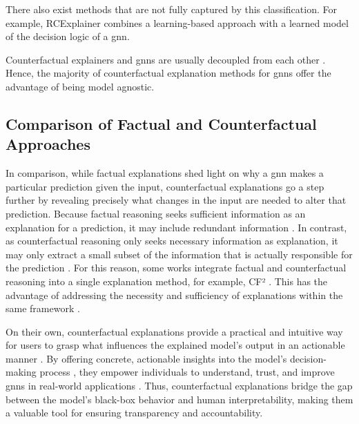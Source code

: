 There also exist methods that are not fully captured by this classification. For example, RCExplainer \cite{bajaj_robust_2021} combines a learning-based approach with a learned model of the decision logic of a \gls{gnn}.

Counterfactual explainers and \glspl{gnn} are usually decoupled from each other \cite{prado-romero_survey_2023}. Hence, the majority of counterfactual explanation methods for \glspl{gnn} offer the advantage of being model agnostic.


\subsection{Comparison of Factual and Counterfactual Approaches}
\label{s_ExplainingGNNs_Comparison}

In comparison, while factual explanations shed light on why a \gls{gnn} makes a particular prediction given the input, counterfactual explanations go a step further by revealing precisely what changes in the input are needed to alter that prediction. Because factual reasoning seeks sufficient information as an explanation for a prediction, it may include redundant information \cite{tan_learning_2022}. In contrast, as counterfactual reasoning only seeks necessary information as explanation, it may only extract a small subset of the information that is actually responsible for the prediction \cite{tan_learning_2022}. For this reason, some works integrate factual and counterfactual reasoning into a single explanation method, for example, CF² \cite{tan_learning_2022}. This has the advantage of addressing the necessity and sufficiency of explanations within the same framework \cite{tan_learning_2022}.

On their own, counterfactual explanations provide a practical and intuitive way for users to grasp what influences the explained model's output in an actionable manner \cite{lucic_cf-gnnexplainer_2022}. By offering concrete, actionable insights into the model's decision-making process \cite{lucic_cf-gnnexplainer_2022}, they empower individuals to understand, trust, and improve \glspl{gnn} in real-world applications \cite{prado-romero_survey_2023}. Thus, counterfactual explanations bridge the gap between the model's black-box behavior and human interpretability, making them a valuable tool for ensuring transparency and accountability.
